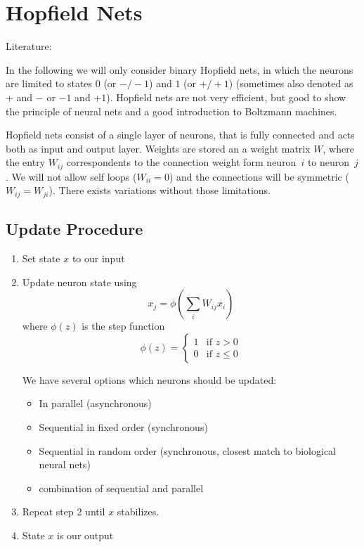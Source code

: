 \section{Hopfield Nets}\label{sec:hopfield-nets}
Literature: \cite[Chapter 5.5]{Patterson1997}

In the following we will only consider binary Hopfield nets, in which the neurons are limited to states $0$ (or $-/-1$) and $1$ (or $+/+1$) (sometimes also denoted as $+$ and $-$ or $-1$ and $+1$). Hopfield nets are not very efficient, but good to show the principle of neural nets and a good introduction to Boltzmann machines.

Hopfield nets consist of a single layer of neurons, that is fully connected and acts both as input and output layer. Weights are stored an a weight matrix $W$, where the entry $W_{ij}$ correspondents to the connection weight form neuron~$i$ to neuron~$j$. We will not allow self loops ($W_{ii} = 0$) and the connections will be symmetric ($W_{ij}=W_{ji}$). There exists variations without those limitations.

\subsection{Update Procedure}
\begin{enumerate}
\item Set state $x$ to our input
\item Update neuron state using
	$$x_j = \phi\left(\sum_i W_{ij} x_i \right)$$
	where $\phi(z)$ is the step function
	\begin{equation}
	\phi(z) = \begin{cases}
		1 & \text{if } z > 0\\
		0 & \text{if } z \leq 0
	\end{cases}
	\end{equation}

	We have several options which neurons should be updated:
	\begin{itemize}
	\item In parallel (asynchronous)
	\item Sequential in fixed order (synchronous)
	\item Sequential in random order (synchronous, closest match to biological neural nets)
	\item combination of sequential and parallel
	\end{itemize}
\item Repeat step 2 until $x$ stabilizes.
\item State $x$ is our output
\end{enumerate}

